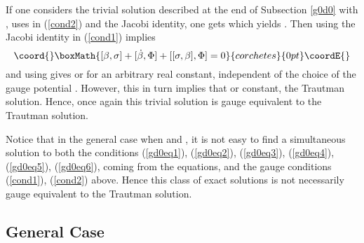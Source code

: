 \documentclass[a4paper,twocolumn,prd,showpacs,amsmath,amssymb]{revtex4}
\begin{document}
If one considers the trivial solution described at the end of Subsection \ref{g0d0}
with \coordHE{}, uses \myHighlight{$[\beta,\omega]= \omega + \epsilon \, \beta$}\coordHE{} in (\ref{cond2})
and the Jacobi identity, one gets \coordHE{} which yields
\coordHE{}. Then using the Jacobi identity in (\ref{cond1})
implies
\[\coord{}\boxMath{ [\beta,\sigma] + [\dot{\beta},\Phi] + [[\sigma,\beta],\Phi] =0 }{corchetes}{0pt}\coordE{}\]
and using \coordHE{} gives \coordHE{}
or \coordHE{} for \coordHE{} an arbitrary real constant, independent of
the choice of the gauge potential \myHighlight{$\Phi$}\coordHE{}. However, this in turn implies that
\coordHE{} or \myHighlight{$\beta=\,$}\coordHE{}constant, the Trautman solution. Hence, once again this
trivial solution is gauge equivalent to the Trautman solution.

Notice that in the general case when \coordHE{} and
\coordHE{}, it is not easy to find a simultaneous solution
to both the conditions (\ref{gd0eq1}), (\ref{gd0eq2}),
(\ref{gd0eq3}), (\ref{gd0eq4}), (\ref{gd0eq5}), (\ref{gd0eq6}),
coming from the \coordHE{} equations, and the gauge conditions
(\ref{cond1}), (\ref{cond2}) above. Hence this class of exact solutions
is not necessarily gauge equivalent to the Trautman solution.

\subsection{\label{ggensol} General Case}
\end{document}
